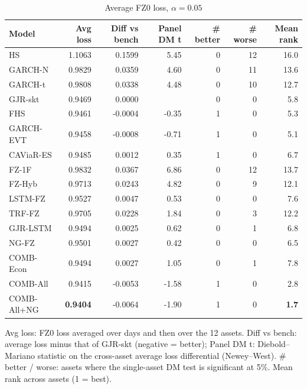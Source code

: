\begin{table}[htbp]
\centering
\footnotesize
\caption{Average FZ0 loss, $\alpha=0.05$}
\label{tab:loss_a050}
\begin{tabular}{lrrrrrr}
\toprule
Model & Avg loss & Diff vs bench & Panel DM t & \# better & \# worse & Mean rank \\
\midrule
HS & 1.1063 & 0.1599 & 5.45 & 0 & 12 & 16.0 \\
GARCH-N & 0.9829 & 0.0359 & 4.60 & 0 & 11 & 13.6 \\
GARCH-t & 0.9808 & 0.0338 & 4.48 & 0 & 10 & 12.7 \\
GJR-skt & 0.9469 & 0.0000 &  & 0 & 0 & 5.8 \\
FHS & 0.9461 & -0.0004 & -0.35 & 1 & 0 & 5.3 \\
GARCH-EVT & 0.9458 & -0.0008 & -0.71 & 1 & 0 & 5.1 \\
CAViaR-ES & 0.9485 & 0.0012 & 0.35 & 1 & 0 & 6.7 \\
FZ-1F & 0.9832 & 0.0367 & 6.86 & 0 & 12 & 13.7 \\
FZ-Hyb & 0.9713 & 0.0243 & 4.82 & 0 & 9 & 12.1 \\
LSTM-FZ & 0.9527 & 0.0047 & 0.53 & 0 & 0 & 7.6 \\
TRF-FZ & 0.9705 & 0.0228 & 1.84 & 0 & 3 & 12.2 \\
GJR-LSTM & 0.9494 & 0.0025 & 0.62 & 0 & 1 & 6.8 \\
NG-FZ & 0.9501 & 0.0027 & 0.42 & 0 & 0 & 6.5 \\
COMB-Econ & 0.9494 & 0.0027 & 1.05 & 0 & 1 & 7.8 \\
COMB-All & 0.9415 & -0.0053 & -1.58 & 1 & 0 & 2.8 \\
COMB-All+NG & \textbf{0.9404} & -0.0064 & -1.90 & 1 & 0 & \textbf{1.7} \\
\bottomrule
\end{tabular}
\par\smallskip\parbox{\linewidth}{\scriptsize Avg loss: FZ0 loss averaged over days and then over the 12 assets. Diff vs bench: average loss minus that of GJR-skt (negative = better); Panel DM t: Diebold--Mariano statistic on the cross-asset average loss differential (Newey--West). \# better / worse: assets where the single-asset DM test is significant at 5\%. Mean rank across assets (1 = best).}
\end{table}